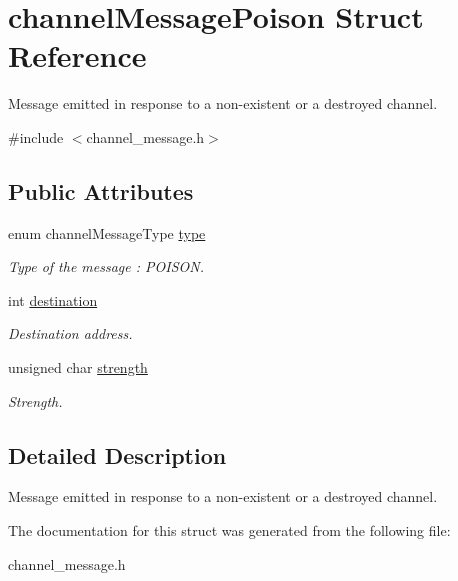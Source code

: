 \hypertarget{structchannelMessagePoison}{\section{channel\-Message\-Poison Struct Reference}
\label{structchannelMessagePoison}
}


Message emitted in response to a non-\/existent or a destroyed channel.  




{\ttfamily \#include $<$channel\-\_\-message.\-h$>$}

\subsection*{Public Attributes}
\begin{DoxyCompactItemize}
\item 
\hypertarget{structchannelMessagePoison_af7d024aa6afcf05bc939f4280d2b6149}{enum channel\-Message\-Type \hyperlink{structchannelMessagePoison_af7d024aa6afcf05bc939f4280d2b6149}{type}}\label{structchannelMessagePoison_af7d024aa6afcf05bc939f4280d2b6149}

\begin{DoxyCompactList}\small\item\em Type of the message \-: P\-O\-I\-S\-O\-N. \end{DoxyCompactList}\item 
\hypertarget{structchannelMessagePoison_a7ae071bb952f2ecc1459023dbe81ac2b}{int \hyperlink{structchannelMessagePoison_a7ae071bb952f2ecc1459023dbe81ac2b}{destination}}\label{structchannelMessagePoison_a7ae071bb952f2ecc1459023dbe81ac2b}

\begin{DoxyCompactList}\small\item\em Destination address. \end{DoxyCompactList}\item 
\hypertarget{structchannelMessagePoison_adba2ff18b018b071fd31eb0648b76317}{unsigned char \hyperlink{structchannelMessagePoison_adba2ff18b018b071fd31eb0648b76317}{strength}}\label{structchannelMessagePoison_adba2ff18b018b071fd31eb0648b76317}

\begin{DoxyCompactList}\small\item\em Strength. \end{DoxyCompactList}\end{DoxyCompactItemize}


\subsection{Detailed Description}
Message emitted in response to a non-\/existent or a destroyed channel. 

The documentation for this struct was generated from the following file\-:\begin{DoxyCompactItemize}
\item 
channel\-\_\-message.\-h\end{DoxyCompactItemize}
